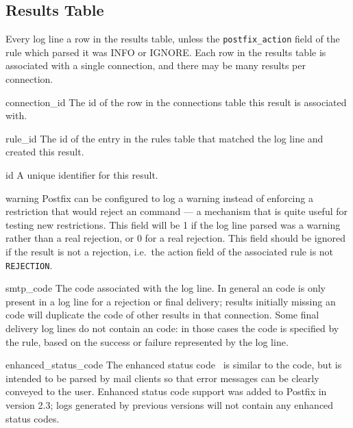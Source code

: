 \subsection{Results Table}

\label{results table}

Every log line a row in the results table, unless the
\texttt{postfix\_action} field of the rule which parsed it was INFO or
IGNORE\@.  Each row in the results table is associated with a single
connection, and there may be many results per connection.

\begin{eqlist}

    \item [connection\_id] The id of the row in the connections table this
        result is associated with.

    \item [rule\_id] The id of the entry in the rules table that matched
        the log line and created this result.

    \item [id] A unique identifier for this result.

    \item [warning] Postfix can be configured to log a warning instead of
        enforcing a restriction that would reject an  command
        --- a mechanism that is quite useful for testing new restrictions.
        This field will be 1 if the log line parsed was a warning rather
        than a real rejection, or 0 for a real rejection.  This field
        should be ignored if the result is not a rejection, i.e.\ the
        action field of the associated rule is not \texttt{REJECTION}.

    \item [smtp\_code] The  code associated with the log
        line.  In general an  code is only present in a log
        line for a rejection or final delivery; results initially missing
        an  code will duplicate the  code of
        other results in that connection.  Some final delivery log lines do
        not contain an  code: in those cases the code is
        specified by the rule, based on the success or failure represented
        by the log line.

    \item [enhanced\_status\_code] The enhanced status code~\cite{RFC3463}
        is similar to the  code, but is intended to be parsed
        by mail clients so that error messages can be clearly conveyed to
        the user.  Enhanced status code support was added to Postfix in
        version 2.3; logs generated by previous versions will not contain
        any enhanced status codes.


\end{eqlist}

